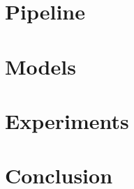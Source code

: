 
\chapter{Pipeline}
\label{cap:pipeline}

\chapter{Models}
\label{cap:models}

\chapter{Experiments}
\label{cap:experiments}

\chapter{Conclusion}
\label{cap:conclusion}



% 
